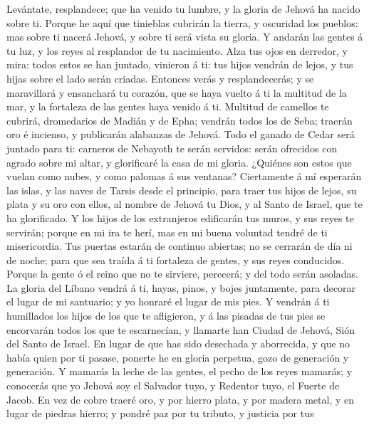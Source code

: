  Levántate, resplandece; que ha venido tu lumbre, y la
gloria de Jehová ha nacido sobre ti.  Porque he aquí que
tinieblas cubrirán la tierra, y oscuridad los pueblos: mas sobre ti
nacerá Jehová, y sobre ti será vista su gloria.  Y andarán
las gentes á tu luz, y los reyes al resplandor de tu nacimiento.
 Alza tus ojos en derredor, y mira: todos estos se han
juntado, vinieron á ti: tus hijos vendrán de lejos, y tus hijas sobre el
lado serán criadas.  Entonces verás y resplandecerás; y se
maravillará y ensanchará tu corazón, que se haya vuelto á ti la multitud
de la mar, y la fortaleza de las gentes haya venido á ti. 
Multitud de camellos te cubrirá, dromedarios de Madián y de Epha;
vendrán todos los de Seba; traerán oro é incienso, y publicarán
alabanzas de Jehová.  Todo el ganado de Cedar será juntado
para ti: carneros de Nebayoth te serán servidos: serán ofrecidos con
agrado sobre mi altar, y glorificaré la casa de mi gloria.
 ¿Quiénes son estos que vuelan como nubes, y como palomas
á sus ventanas?  Ciertamente á mí esperarán las islas, y
las naves de Tarsis desde el principio, para traer tus hijos de lejos,
su plata y su oro con ellos, al nombre de Jehová tu Dios, y al Santo de
Israel, que te ha glorificado.  Y los hijos de los
extranjeros edificarán tus muros, y sus reyes te servirán; porque en mi
ira te herí, mas en mi buena voluntad tendré de ti misericordia.
 Tus puertas estarán de continuo abiertas; no se cerrarán
de día ni de noche; para que sea traída á ti fortaleza de gentes, y sus
reyes conducidos.  Porque la gente ó el reino que no te
sirviere, perecerá; y del todo serán asoladas.  La gloria
del Líbano vendrá á ti, hayas, pinos, y bojes juntamente, para decorar
el lugar de mi santuario; y yo honraré el lugar de mis pies.
 Y vendrán á ti humillados los hijos de los que te
afligieron, y á las pisadas de tus pies se encorvarán todos los que te
escarnecían, y llamarte han Ciudad de Jehová, Sión del Santo de Israel.
 En lugar de que has sido desechada y aborrecida, y que
no había quien por ti pasase, ponerte he en gloria perpetua, gozo de
generación y generación.  Y mamarás la leche de las
gentes, el pecho de los reyes mamarás; y conocerás que yo Jehová soy el
Salvador tuyo, y Redentor tuyo, el Fuerte de Jacob.  En
vez de cobre traeré oro, y por hierro plata, y por madera metal, y en
lugar de piedras hierro; y pondré paz por tu tributo, y justicia por tus
